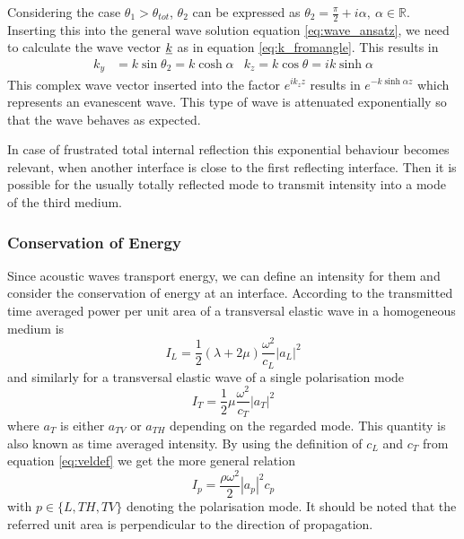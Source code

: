 Considering the case $\theta_1 > \theta_{tot}$, $\theta_2$ can be expressed as
$\theta_2 = \frac{\pi}{2} + i\alpha,\ \alpha\in\mathbb{R}$. Inserting this into
the general wave solution equation \ref{eq:wave_ansatz}, we need to calculate
the wave vector $\underline{k}$ as in equation \ref{eq:k_fromangle}. This results
in
\begin{align}
    k_y & = k \sin\theta_2 = k \cosh\alpha & k_z= k \cos\theta = ik \sinh\alpha
\end{align}
This complex wave vector inserted into the factor $e^{ik_zz}$ results in
$e^{-k\sinh\alpha z}$ which represents an evanescent wave. This type of wave is
attenuated exponentially so that the wave behaves as expected.

In case of frustrated total internal reflection this exponential behaviour
becomes relevant, when another interface is close to the first reflecting
interface. Then it is possible for the usually totally reflected mode to
transmit intensity into a mode of the third medium.

\subsubsection{Conservation of Energy} \label{sec:sanitycheck}
Since acoustic waves transport energy, we can define an intensity for them and
consider the conservation of energy at an interface.
According to \cite[166]{achenbach1973wave} the transmitted time averaged power
per unit area of a transversal elastic wave in a homogeneous medium is
\begin{equation}
    I_L = \frac{1}{2}(\lambda+2\mu)\frac{\omega^2}{c_L}|a_L|^2
\end{equation}
and similarly for a transversal elastic wave of a single polarisation mode
\begin{equation}
    I_T = \frac{1}{2}\mu\frac{\omega^2}{c_T}|a_T|^2
\end{equation}
where $a_T$ is either $a_{TV}$ or $a_{TH}$ depending on the regarded mode. This
quantity is also known as time averaged intensity. By using the definition of
$c_L$ and $c_T$ from equation \ref{eq:veldef} we get the more general relation
\begin{equation} \label{eq:generalIntensity}
    I_p = \frac{\rho\omega^2}{2} |a_p|^2 c_p
\end{equation}
with $p\in \{L,TH, TV\}$ denoting the polarisation mode. It should be noted
that the referred unit area is perpendicular to the direction of propagation.


